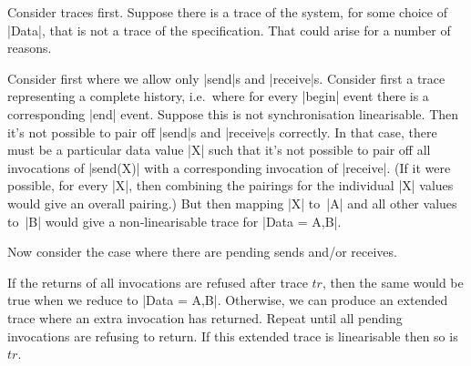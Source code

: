 Consider traces first.  Suppose there is a trace of the system, for
some choice of |Data|, that is not a trace of the specification.  That could
arise for a number of reasons.

Consider first where we allow only |send|s and |receive|s.  Consider first a
trace representing a complete history, i.e.~where for every |begin| event
there is a corresponding |end| event.  Suppose this is not synchronisation
linearisable.  Then it's not possible to pair off |send|s and |receive|s
correctly.  In that case, there must be a particular data value |X| such that
it's not possible to pair off all invocations of |send(X)| with a
corresponding invocation of |receive|.  (If it were possible, for every |X|,
then combining the pairings for the individual |X| values would give an
overall pairing.)  But then mapping |X| to~|A| and all other values to~|B|
would give a non-linearisable trace for |Data = {A,B}|.

Now consider the case where there are pending sends and/or receives.  

If the returns of all invocations are refused after trace $tr$, then the same
would be true when we reduce to |Data = {A,B}|.  Otherwise, we can produce an
extended trace where an extra invocation has returned.  Repeat until all
pending invocations are refusing to return.  If this extended trace is
linearisable then so is~$tr$. 
